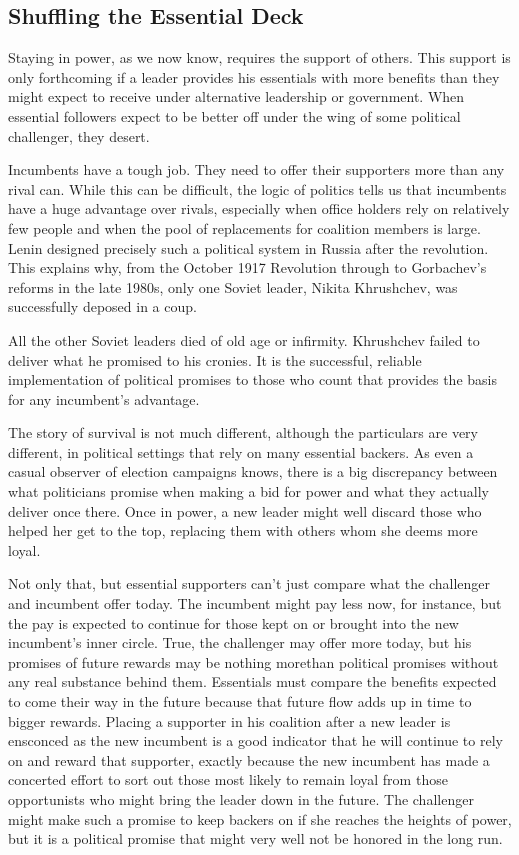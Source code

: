 \documentclass[10pt]{article}
\begin{document}
\subsection{Shuffling the Essential Deck}

{\large Staying in power, as we now know, requires the support of others. This
support is only forthcoming if a leader provides his essentials with more
benefits than they might expect to receive under alternative leadership or
government. When essential followers expect to be better off under the wing of
some political challenger, they desert.}

{\large Incumbents have a tough job. They need to offer their supporters more
than any rival can. While this can be difficult, the logic of politics tells us
that incumbents have a huge advantage over rivals, especially when office holders
rely on relatively few people and when the pool of replacements for coalition
members is large. Lenin designed precisely such a political system in Russia
after the revolution. This explains why, from the October 1917 Revolution through
to Gorbachev's reforms in the late 1980s, only one Soviet leader, Nikita
Khrushchev, was successfully deposed in a coup.}

{\large All the other Soviet leaders died of old age or infirmity. Khrushchev
failed to deliver what he promised to his cronies. It is the successful, reliable
implementation of political promises to those who count that provides the basis
for any incumbent's advantage.}

{\large The story of survival is not much different, although the particulars
are very different, in political settings that rely on many essential backers. As
even a casual observer of election campaigns knows, there is a big discrepancy
between what politicians promise when making a bid for power and what they
actually deliver once there. Once in power, a new leader might well discard those
who helped her get to the top, replacing them with others whom she deems more
loyal.}

{\large Not only that, but essential supporters can't just compare what the
challenger and incumbent offer today. The incumbent might pay less now, for
instance, but the pay is expected to continue for those kept on or brought into
the new incumbent's inner circle. True, the challenger may offer more today, but
his promises of future rewards may be nothing morethan political promises without
any real substance behind them. Essentials must compare the benefits expected to
come their way in the future because that future flow adds up in time to bigger
rewards. Placing a supporter in his coalition after a new leader is ensconced as
the new incumbent is a good indicator that he will continue to rely on and reward
that supporter, exactly because the new incumbent has made a concerted effort to
sort out those most likely to remain loyal from those opportunists who might
bring the leader down in the future. The challenger might make such a promise to
keep backers on if she reaches the heights of power, but it is a political
promise that might very well not be honored in the long run.}
\end{document}
